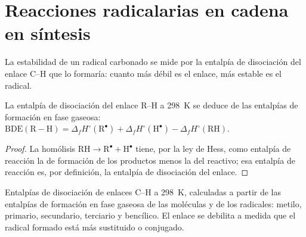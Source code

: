 \section{Reacciones radicalarias en cadena en síntesis}

La estabilidad de un radical carbonado se mide por la entalpía de disociación
del enlace C--H que lo formaría: cuanto más débil es el enlace, más
estable es el radical.

\begin{proposition}\label{prop:b3:radicals-carbenes:bde}
La entalpía de disociación del enlace R--H a \qty{298}{K} se deduce de las entalpías de formación en fase gaseosa:
$\mathrm{BDE(R{-}H)} = \Delta_fH^\circ(\mathrm R^\bullet) + \Delta_fH^\circ(\mathrm H^\bullet) - \Delta_fH^\circ(\mathrm{RH})$.
\end{proposition}

\begin{proof}
La homólisis $\mathrm{RH \to R^\bullet + H^\bullet}$ tiene, por la ley de Hess, como entalpía de reacción la de formación de los productos
menos la del reactivo; esa entalpía de reacción es, por definición, la entalpía de disociación
del enlace.
\end{proof}

\begin{omfigure}

{\small Entalpías de disociación de enlaces C--H a \qty{298}{K}, calculadas a partir de las entalpías de
formación en fase gaseosa de las moléculas y de los radicales: metilo, primario,
secundario, terciario y bencílico. El enlace se debilita a medida que el radical formado está
más sustituido o conjugado.}
\end{omfigure}

